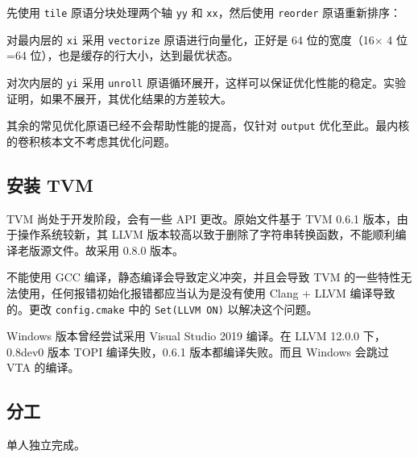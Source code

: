 \documentclass[UTF8]{ctexart}
\begin{document}


先使用 \verb"tile" 原语分块处理两个轴 \verb"yy" 和 \verb"xx"，然后使用 \verb"reorder" 原语重新排序：



对最内层的 \verb"xi" 采用 \verb"vectorize" 原语进行向量化，正好是 64 位的宽度（16$\times$ 4 位=64 位），也是缓存的行大小，达到最优状态。

对次内层的 \verb"yi" 采用 \verb"unroll" 原语循环展开，这样可以保证优化性能的稳定。实验证明，如果不展开，其优化结果的方差较大。

其余的常见优化原语已经不会帮助性能的提高，仅针对 \verb"output" 优化至此。最内核的卷积核本文不考虑其优化问题。

\subsection*{安装 TVM}

TVM 尚处于开发阶段，会有一些 API 更改。原始文件基于 TVM 0.6.1 版本，由于操作系统较新，其 LLVM 版本较高以致于删除了字符串转换函数\cite{issue}，不能顺利编译老版源文件。故采用 0.8.0 版本。

不能使用 GCC 编译，静态编译会导致定义冲突，并且会导致 TVM 的一些特性无法使用，任何报错初始化报错都应当认为是没有使用 Clang + LLVM 编译导致的。更改 \verb"config.cmake" 中的 \verb"Set(LLVM ON)" 以解决这个问题。

Windows 版本曾经尝试采用 Visual Studio 2019 编译。在 LLVM 12.0.0 下，0.8dev0 版本 TOPI 编译失败，0.6.1 版本都编译失败。而且 Windows 会跳过 VTA 的编译。

\subsection*{分工}

单人独立完成。


\end{document}
